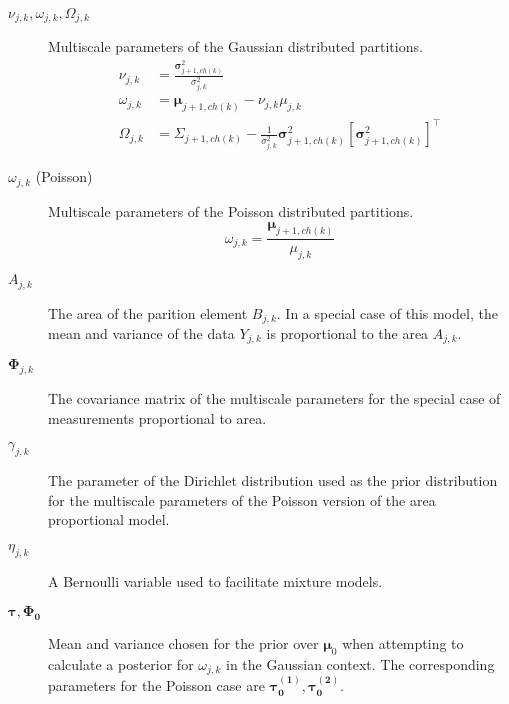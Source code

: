 \documentclass[a4paper,12pt]{article}
\theoremstyle{definition}
\begin{document}
\begin{description}
  \item[$\nu_{j,k}, \omega_{j,k}, \Omega_{j,k}$] Multiscale parameters of the Gaussian distributed partitions.
  \begin{align}
    \nu_{j,k} &= \frac{\boldsymbol{\sigma}^2_{j+1,ch(k)}}{\sigma^2_{j,k}} \\
    \omega_{j,k} &= \boldsymbol{\mu}_{j+1,ch(k)} - \nu_{j,k}\mu_{j,k} \\
    \Omega_{j,k} &= \Sigma_{j+1,ch(k)} - \frac{1}{\sigma^2_{j,k}}\boldsymbol{\sigma}^2_{j+1,ch(k)}\left[ \boldsymbol{\sigma}^2_{j+1,ch(k)} \right]^{\top}
  \end{align}
  \item[$\omega_{j,k}$ (Poisson)] Multiscale parameters of the Poisson distributed partitions.
  \begin{equation}
    \omega_{j,k} = \frac{\boldsymbol{\mu}_{j+1, ch(k)}}{\mu_{j,k}}
  \end{equation}
  \item[$A_{j,k}$] The area of the parition element $B_{j,k}$. In a special case of this model, the mean and variance of the data $Y_{j,k}$ is proportional to the area $A_{j,k}$.
  \item[$\boldsymbol{\Phi}_{j,k}$] The covariance matrix of the multiscale parameters for the special case of measurements proportional to area.
  \item[$\gamma_{j,k}$] The parameter of the Dirichlet distribution used as the prior distribution for the multiscale parameters of the Poisson version of the area proportional model.
  \item[$\eta_{j,k}$] A Bernoulli variable used to facilitate mixture models.
	\item[$\boldsymbol{\tau}, \boldsymbol{\Phi_0}$] Mean and variance chosen for the prior over $\boldsymbol{\mu}_0$ when attempting to calculate a posterior for $\omega_{j,k}$ in the Gaussian context. The corresponding parameters for the Poisson case are $\boldsymbol{\tau_0^{(1)}}, \boldsymbol{\tau_0^{(2)}}$.
\end{description}
\end{document}
